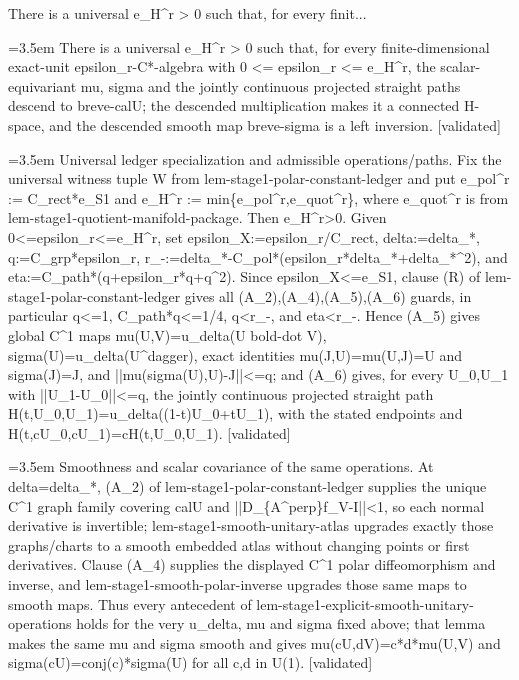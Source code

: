\documentclass{article}
\newcommand{\step}[1]{\par\noindent\hangindent=3.5em\hangafter=1%
  \makebox[3.5em][l]{\textbf{#1.}}}
\newcommand{\steptag}[1]{\hfill{\small\textsf{[#1]}}}
\begin{document}
\begin{proofbox}{There is a universal e\_H\textasciicircum{}r > 0 such that, for every finit...}
\step{1} There is a universal e\_H\textasciicircum{}r > 0 such that, for every finite-dimensional exact-unit epsilon\_r-C*-algebra with 0 <= epsilon\_r <= e\_H\textasciicircum{}r, the scalar-equivariant mu, sigma and the jointly continuous projected straight paths descend to breve-calU; the descended multiplication makes it a connected H-space, and the descended smooth map breve-sigma is a left inversion. \steptag{validated} \\[6pt]
\step{1.1} Universal ledger specialization and admissible operations/paths. Fix the universal witness tuple W from lem-stage1-polar-constant-ledger and put e\_pol\textasciicircum{}r := C\_rect*e\_S1 and e\_H\textasciicircum{}r := min\{e\_pol\textasciicircum{}r,e\_quot\textasciicircum{}r\}, where e\_quot\textasciicircum{}r is from lem-stage1-quotient-manifold-package. Then e\_H\textasciicircum{}r>0. Given 0<=epsilon\_r<=e\_H\textasciicircum{}r, set epsilon\_X:=epsilon\_r/C\_rect, delta:=delta\_*, q:=C\_grp*epsilon\_r, r\_-:=delta\_*-C\_pol*(epsilon\_r*delta\_*+delta\_*\textasciicircum{}2), and eta:=C\_path*(q+epsilon\_r*q+q\textasciicircum{}2). Since epsilon\_X<=e\_S1, clause (R) of lem-stage1-polar-constant-ledger gives all (A\_2),(A\_4),(A\_5),(A\_6) guards, in particular q<=1, C\_path*q<=1/4, q<r\_-, and eta<r\_-. Hence (A\_5) gives global C\textasciicircum{}1 maps mu(U,V)=u\_delta(U bold-dot V), sigma(U)=u\_delta(U\textasciicircum{}dagger), exact identities mu(J,U)=mu(U,J)=U and sigma(J)=J, and ||mu(sigma(U),U)-J||<=q; and (A\_6) gives, for every U\_0,U\_1 with ||U\_1-U\_0||<=q, the jointly continuous projected straight path H(t,U\_0,U\_1)=u\_delta((1-t)U\_0+tU\_1), with the stated endpoints and H(t,cU\_0,cU\_1)=cH(t,U\_0,U\_1). \steptag{validated} \\[4pt]
\step{1.2} Smoothness and scalar covariance of the same operations. At delta=delta\_*, (A\_2) of lem-stage1-polar-constant-ledger supplies the unique C\textasciicircum{}1 graph family covering calU and ||D\_\{A\textasciicircum{}perp\}f\_V-I||<1, so each normal derivative is invertible; lem-stage1-smooth-unitary-atlas upgrades exactly those graphs/charts to a smooth embedded atlas without changing points or first derivatives. Clause (A\_4) supplies the displayed C\textasciicircum{}1 polar diffeomorphism and inverse, and lem-stage1-smooth-polar-inverse upgrades those same maps to smooth maps. Thus every antecedent of lem-stage1-explicit-smooth-unitary-operations holds for the very u\_delta, mu and sigma fixed above; that lemma makes the same mu and sigma smooth and gives mu(cU,dV)=c*d*mu(U,V) and sigma(cU)=conj(c)*sigma(U) for all c,d in U(1). \steptag{validated} \\[4pt]

\end{proofbox}
\end{document}
